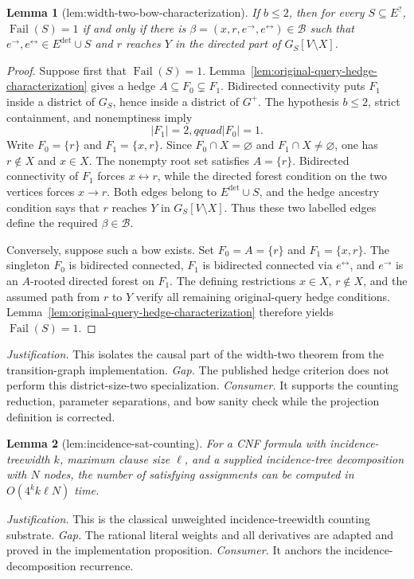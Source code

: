 \documentclass{article}
\newtheorem{lemma}{Lemma}
\begin{document}
\begin{lemma}[lem:width-two-bow-characterization]\label{lem:width-two-bow-characterization}
If \(b\le2\), then for every \(S\subseteq E^{?}\), \(\operatorname{Fail}(S)=1\) if and only if there is \(\beta=(x,r,e^{\to},e^{\leftrightarrow})\in\mathcal B\) such that \(e^{\to},e^{\leftrightarrow}\in E^{\mathrm{det}}\cup S\) and \(r\) reaches \(Y\) in the directed part of \(G_S[V\setminus X]\).
\end{lemma}
\begin{proof}
Suppose first that \(\operatorname{Fail}(S)=1\).  Lemma~\ref{lem:original-query-hedge-characterization} gives a hedge \(A\subseteq F_0\subsetneq F_1\).  Bidirected connectivity puts \(F_1\) inside a district of \(G_S\), hence inside a district of \(G^{+}\).  The hypothesis \(b\le2\), strict containment, and nonemptiness imply
\[
 |F_1|=2,qquad |F_0|=1.
\]
Write \(F_0=\{r\}\) and \(F_1=\{x,r\}\).  Since \(F_0\cap X=\varnothing\) and \(F_1\cap X\ne\varnothing\), one has \(r\notin X\) and \(x\in X\).  The nonempty root set satisfies \(A=\{r\}\).  Bidirected connectivity of \(F_1\) forces \(x\leftrightarrow r\), while the directed forest condition on the two vertices forces \(x\to r\).  Both edges belong to \(E^{\mathrm{det}}\cup S\), and the hedge ancestry condition says that \(r\) reaches \(Y\) in \(G_S[V\setminus X]\).  Thus these two labelled edges define the required \(\beta\in\mathcal B\).

Conversely, suppose such a bow exists.  Set \(F_0=A=\{r\}\) and \(F_1=\{x,r\}\).  The singleton \(F_0\) is bidirected connected, \(F_1\) is bidirected connected via \(e^{\leftrightarrow}\), and \(e^{\to}\) is an \(A\)-rooted directed forest on \(F_1\).  The defining restrictions \(x\in X\), \(r\notin X\), and the assumed path from \(r\) to \(Y\) verify all remaining original-query hedge conditions.  Lemma~\ref{lem:original-query-hedge-characterization} therefore yields \(\operatorname{Fail}(S)=1\).
\end{proof}
\par\smallskip\noindent \textit{Justification.} This isolates the causal part of the width-two theorem from the transition-graph implementation. \textit{Gap.} The published hedge criterion does not perform this district-size-two specialization. \textit{Consumer.} It supports the counting reduction, parameter separations, and bow sanity check while the projection definition is corrected.

\begin{lemma}[lem:incidence-sat-counting]\label{lem:incidence-sat-counting}
For a CNF formula with incidence-treewidth \(k\), maximum clause size \(\ell\), and a supplied incidence-tree decomposition with \(N\) nodes, the number of satisfying assignments can be computed in \(O(4^k k\ell N)\) time.
\end{lemma}
\par\smallskip\noindent \textit{Justification.} This is the classical unweighted incidence-treewidth counting substrate. \textit{Gap.} The rational literal weights and all derivatives are adapted and proved in the implementation proposition. \textit{Consumer.} It anchors the incidence-decomposition recurrence.
\end{document}
